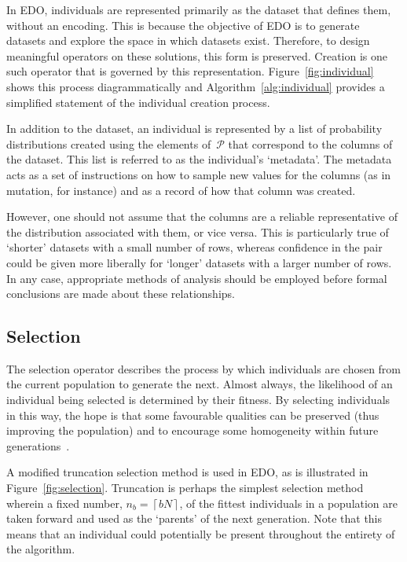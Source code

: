 In EDO, individuals are represented primarily as the dataset that defines them,
without an encoding. This is because the objective of EDO is to generate
datasets and explore the space in which datasets exist. Therefore, to design
meaningful operators on these solutions, this form is preserved. Creation is one
such operator that is governed by this representation.
Figure~\ref{fig:individual} shows this process diagrammatically and
Algorithm~\ref{alg:individual} provides a simplified statement of the individual
creation process.

In addition to the dataset, an individual is represented by a list of
probability distributions created using the elements of~\(\mathcal{P}\) that
correspond to the columns of the dataset. This list is referred to as the
individual's `metadata'. The metadata acts as a set of instructions on how to
sample new values for the columns (as in mutation, for instance) and as a record
of how that column was created.

However, one should not assume that the columns are a reliable representative of
the distribution associated with them, or vice versa. This is particularly true
of `shorter' datasets with a small number of rows, whereas confidence in the
pair could be given more liberally for `longer' datasets with a larger number
of rows. In any case, appropriate methods of analysis should be employed before
formal conclusions are made about these relationships.



\subsection{Selection}

The selection operator describes the process by which individuals are chosen
from the current population to generate the next. Almost always, the likelihood
of an individual being selected is determined by their fitness. By selecting
individuals in this way, the hope is that some favourable qualities can be
preserved (thus improving the population) and to encourage some
homogeneity within future generations~\cite{Back1994}.


A modified truncation selection method is used in EDO, as is illustrated in
Figure~\ref{fig:selection}. Truncation is perhaps the simplest selection method
wherein a fixed number, \(n_b = \left\lceil b N\right\rceil\), of the fittest
individuals in a population are taken forward and used as the `parents' of the
next generation. Note that this means that an individual could potentially be
present throughout the entirety of the algorithm.

